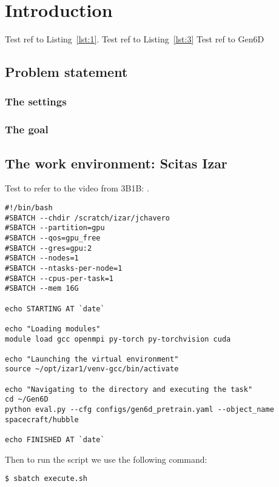 
\chapter{Introduction}\label{chapter:introduction}
Test ref to Listing~\ref{lst:1}. Test ref to Listing~\ref{lst:3}
Test ref to Gen6D \cite{liu2023gen6d}
\section{Problem statement}
\subsection{The settings}
\subsection{The goal}
\section{The work environment: Scitas Izar}
Test to refer to the video from 3B1B: \cite{3b1b-1}.
\begin{lstlisting}[style=bashstyle, caption={Bash script \texttt{execute.sh} to run a machine learning model on Scitas Izar EPFL. While the overall structure remains consistent, this script is specific to Gen6D's architecture, further discussed later.}]
#!/bin/bash
#SBATCH --chdir /scratch/izar/jchavero
#SBATCH --partition=gpu
#SBATCH --qos=gpu_free
#SBATCH --gres=gpu:2
#SBATCH --nodes=1
#SBATCH --ntasks-per-node=1
#SBATCH --cpus-per-task=1
#SBATCH --mem 16G

echo STARTING AT `date`

echo "Loading modules"
module load gcc openmpi py-torch py-torchvision cuda

echo "Launching the virtual environment"
source ~/opt/izar1/venv-gcc/bin/activate

echo "Navigating to the directory and executing the task"
cd ~/Gen6D                                    
python eval.py --cfg configs/gen6d_pretrain.yaml --object_name spacecraft/hubble

echo FINISHED AT `date`
\end{lstlisting}

\noindent Then to run the script we use the following command:
\begin{lstlisting}[style=bashstyle, caption=Linux command to run the bash script.]
	$ sbatch execute.sh
\end{lstlisting}